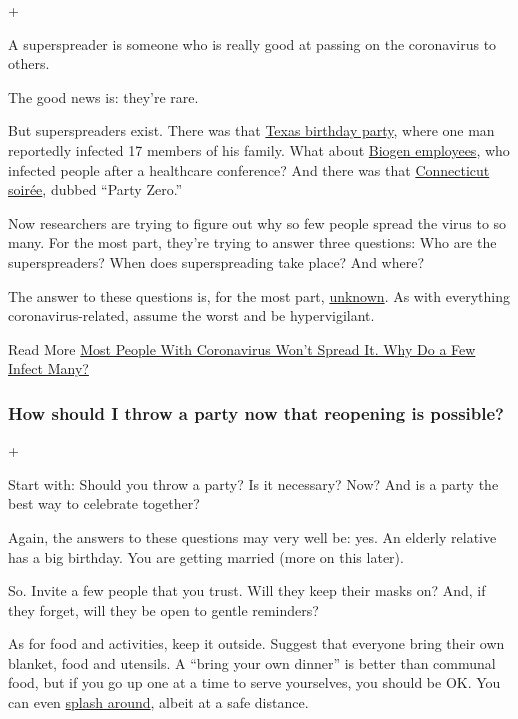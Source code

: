 +

A superspreader is someone who is really good at passing on the
coronavirus to others.

The good news is: they're rare.

But superspreaders exist. There was that
\href{https://apnews.com/d9a6ca7eef083315648003509d07515a}{Texas
birthday party}, where one man reportedly infected 17 members of his
family. What about
\href{https://www.nytimes3xbfgragh.onion/2020/04/12/us/coronavirus-biogen-boston-superspreader.html}{Biogen
employees}, who infected people after a healthcare conference? And there
was that
\href{https://www.nytimes3xbfgragh.onion/2020/03/23/us/coronavirus-westport-connecticut-party-zero.html}{Connecticut
soirée}, dubbed ``Party Zero.''

Now researchers are trying to figure out why so few people spread the
virus to so many. For the most part, they're trying to answer three
questions: Who are the superspreaders? When does superspreading take
place? And where?

The answer to these questions is, for the most part,
\href{https://www.nytimes3xbfgragh.onion/2020/06/30/science/how-coronavirus-spreads.html}{unknown}.
As with everything coronavirus-related, assume the worst and be
hypervigilant.

 Read More
\href{https://www.nytimes3xbfgragh.onion/2020/06/30/science/how-coronavirus-spreads.html}{Most
People With Coronavirus Won't Spread It. Why Do a Few Infect Many?}

\hypertarget{how-should-i-throw-a-party-now-that-reopening-is-possible}{%
\subsubsection{How should I throw a party now that reopening is
possible?}\label{how-should-i-throw-a-party-now-that-reopening-is-possible}}

+

Start with: Should you throw a party? Is it necessary? Now? And is a
party the best way to celebrate together?

Again, the answers to these questions may very well be: yes. An elderly
relative has a big birthday. You are getting married (more on this
later).

So. Invite a few people that you trust. Will they keep their masks on?
And, if they forget, will they be open to gentle reminders?

As for food and activities, keep it outside. Suggest that everyone bring
their own blanket, food and utensils. A ``bring your own dinner'' is
better than communal food, but if you go up one at a time to serve
yourselves, you should be OK. You can even
\href{https://www.nytimes3xbfgragh.onion/2020/06/06/at-home/coronavirus-cool-off-even-without-a-deep-end.html}{splash
around}, albeit at a safe distance.

